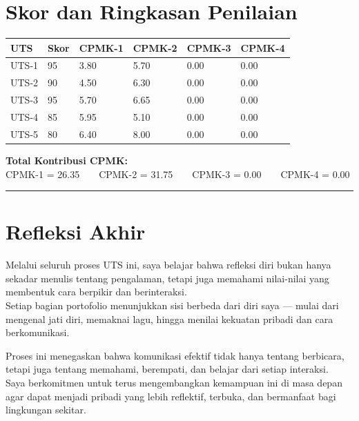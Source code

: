 \documentclass[
  letterpaper,
  DIV=11,
  numbers=noendperiod]{scrreprt}
\begin{document}
\section*{Skor dan Ringkasan
Penilaian}\label{skor-dan-ringkasan-penilaian}


\begin{longtable}[]{@{}llllll@{}}
\toprule\noalign{}
UTS & Skor & CPMK-1 & CPMK-2 & CPMK-3 & CPMK-4 \\
\midrule\noalign{}
\endhead
\bottomrule\noalign{}
\endlastfoot
UTS-1 & 95 & 3.80 & 5.70 & 0.00 & 0.00 \\
UTS-2 & 90 & 4.50 & 6.30 & 0.00 & 0.00 \\
UTS-3 & 95 & 5.70 & 6.65 & 0.00 & 0.00 \\
UTS-4 & 85 & 5.95 & 5.10 & 0.00 & 0.00 \\
UTS-5 & 80 & 6.40 & 8.00 & 0.00 & 0.00 \\
\end{longtable}

\textbf{Total Kontribusi CPMK:}\\
CPMK-1 = 26.35  CPMK-2 = 31.75  CPMK-3 = 0.00  CPMK-4 = 0.00

\begin{center}\rule{0.5\linewidth}{0.5pt}\end{center}

\section*{Refleksi Akhir}\label{refleksi-akhir-1}


Melalui seluruh proses UTS ini, saya belajar bahwa refleksi diri bukan
hanya sekadar menulis tentang pengalaman, tetapi juga memahami
nilai-nilai yang membentuk cara berpikir dan berinteraksi.\\
Setiap bagian portofolio menunjukkan sisi berbeda dari diri saya ---
mulai dari mengenal jati diri, memaknai lagu, hingga menilai kekuatan
pribadi dan cara berkomunikasi.

Proses ini menegaskan bahwa komunikasi efektif tidak hanya tentang
berbicara, tetapi juga tentang memahami, berempati, dan belajar dari
setiap interaksi.\\
Saya berkomitmen untuk terus mengembangkan kemampuan ini di masa depan
agar dapat menjadi pribadi yang lebih reflektif, terbuka, dan bermanfaat
bagi lingkungan sekitar.
\end{document}
